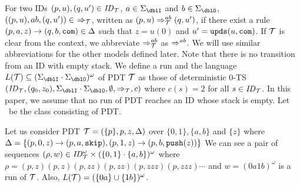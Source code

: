 For two IDs $(p, u), (q, u')\in \mathit{ID}_{\cal T}$,
$a\in\Sigma_\dblI$ and $b\in\Sigma_\dblO$,
$((p, u), ab, (q, u'))\in\ \Rightarrow_\calT$,
written as $(p, u) \Rightarrow_{{\cal T}}^{ab} (q, u')$,
if there exist a rule $(p, a, z) \rightarrow (q, b, \mathtt{com}) \in \Delta$
such that $z=u(0)$ and $u'=\mathtt{upds}(u,\mathtt{com})$.
If ${\cal T}$ is clear from the context,
we abbreviate
$\Rightarrow_{{\cal T}}^{ab}$ as $\Rightarrow^{ab}$.
We will use similar abbreviations for the other models defined later.
Note that there is no transition from an ID with empty stack.
We define a run and the language $L(\calT)\subseteq (\Sigma_\dblI \cdot \Sigma_\dblO)^{\omega}$ of PDT ${\cal T}$ as those of
deterministic $0$-TS $(\ID_\calT, (q_0,z_0), \Sigma_\dblI\cdot\Sigma_\dblO, \emptyset, \Rightarrow_\calT, c)$ where $c(s)=2$ for all $s\in\mathit{ID}_{\cal T}$.
In this paper,
we assume that no run of PDT reaches an ID whose stack is empty.
Let \PDT\ be the class consisting of PDT.

\begin{example}
\label{ex: PDT}
Let us consider PDT
${\cal T} = (\{p\},p,z,\Delta)$
over $\{0,1\},\{a,b\}$ and $\{z\}$ where
$\Delta = \{
(p, 0, z) \rightarrow (p, a, \mathtt{skip}),
(p, 1, z) \rightarrow (p, b, \mathtt{push}(z))
\}$
We can see
a pair of sequences $(\rho,w)\in \mathit{ID}_{\cal T}^\omega\times (\{0,1\}\cdot\{a,b\})^\omega$ where
$\rho=(p,z)(p,z)(p,zz)(p,zz)(p,zzz)(p,zzz)\cdots$
and $w=(0a1b)^\omega$
is a run of ${\cal T}$.
Also, $L({\cal T})=(\{0a\}\cup\{1b\})^\omega$.
\end{example}


